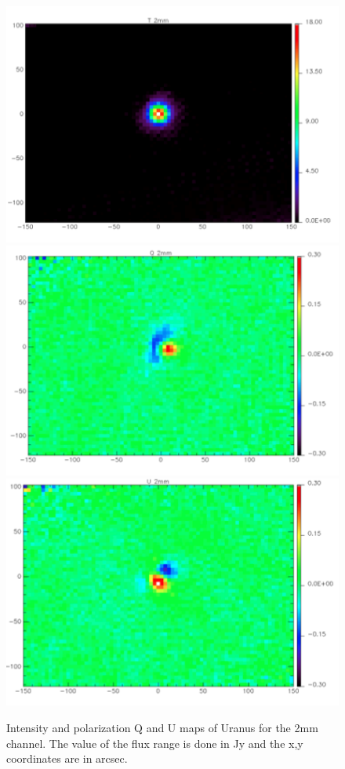 \documentclass[12pt,a4]{article}
\begin{document}
\begin{figure} [t!]

\includegraphics[scale=0.3]{figures/map_2mm_Uranus.png}
\includegraphics[scale=0.3]{figures/map_q_2mm_Uranus.png}
\includegraphics[scale=0.3]{figures/map_u_2mm_Uranus.png}
\caption{Intensity and polarization Q and U maps of Uranus for the 2mm channel.
 The value of the flux range is done in Jy and the x,y coordinates are in arcsec.}
\label{fig:Uranus_2mm}
  \end{figure}
\end{document}

